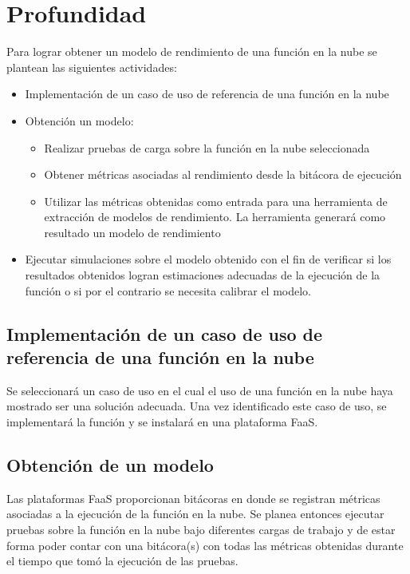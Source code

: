 \section{Profundidad}
Para lograr obtener un modelo de rendimiento de una función en la nube se plantean las siguientes actividades:
\begin{itemize}
    \item Implementación de un caso de uso de referencia de una función en la nube 
    \item Obtención un modelo:
    \begin{itemize}
        \item Realizar pruebas de carga sobre la función en la nube seleccionada
        \item Obtener métricas asociadas al rendimiento desde la bitácora de ejecución
        \item Utilizar las métricas obtenidas como entrada para una herramienta de extracción de modelos de rendimiento. La herramienta generará como resultado un modelo de rendimiento
    \end{itemize}
    \item Ejecutar simulaciones sobre el modelo obtenido con el fin de verificar si los resultados obtenidos logran estimaciones adecuadas de la ejecución de la función o si por el contrario se necesita calibrar el modelo.
\end{itemize}

\subsection{Implementación de un caso de uso de referencia de una función en la nube} 
Se seleccionará un caso de uso en el cual el uso de una función en la nube haya mostrado ser una solución adecuada. Una vez identificado este caso de uso, se implementará la función y se instalará en una plataforma FaaS.

\subsection{Obtención de un modelo} 
Las plataformas FaaS proporcionan bitácoras en donde se registran métricas asociadas a la ejecución de la función en la nube. Se planea entonces ejecutar pruebas sobre la función en la nube bajo diferentes cargas de trabajo y de estar forma poder contar con una bitácora(s) con todas las métricas obtenidas durante el tiempo que tomó la ejecución de las pruebas. 


